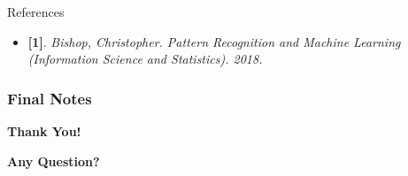 \documentclass[compress,oilve]{beamer}
\begin{document}






\begin{frame}{References}
\begin{itemize}
\item{} \textbf{[1]}. \textit{Bishop, Christopher. Pattern Recognition and Machine Learning (Information Science and Statistics). 2018.}
\end{itemize}
\end{frame}



\frametitle{Final Notes}
\centering
\vspace{50 pt}
\textbf{Thank You!}
\vspace{50pt}

\textbf{Any Question?}
\end{document}
